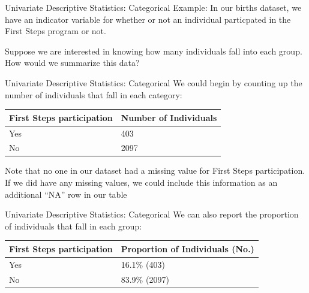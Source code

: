 \documentclass[
  ignorenonframetext,
]{beamer}
\begin{document}
\begin{frame}{Univariate Descriptive Statistics: Categorical}
\protect\hypertarget{univariate-descriptive-statistics-categorical}{}
{Example}: In our births dataset, we have an indicator variable for
whether or not an individual particpated in the First Steps program or
not.

Suppose we are interested in knowing how many individuals fall into each
group. How would we summarize this data?
\end{frame}

\begin{frame}{Univariate Descriptive Statistics: Categorical}
\protect\hypertarget{univariate-descriptive-statistics-categorical-1}{}
We could begin by counting up the number of individuals that fall in
each category:

\begin{longtable}[]{@{}ll@{}}
\toprule
\textbf{First Steps participation} & \textbf{Number of Individuals} \\
\midrule
\endhead
Yes & 403 \\
No & 2097 \\
\bottomrule
\end{longtable}

Note that no one in our dataset had a missing value for First Steps
participation. If we did have any missing values, we could include this
information as an additional ``NA'' row in our table
\end{frame}

\begin{frame}{Univariate Descriptive Statistics: Categorical}
\protect\hypertarget{univariate-descriptive-statistics-categorical-2}{}
We can also report the proportion of individuals that fall in each
group:

\begin{longtable}[]{@{}ll@{}}
\toprule
\textbf{First Steps participation} & \textbf{Proportion of Individuals
(No.)} \\
\midrule
\endhead
Yes & 16.1\% (403) \\
No & 83.9\% (2097) \\
\bottomrule
\end{longtable}
\end{frame}
\end{document}
